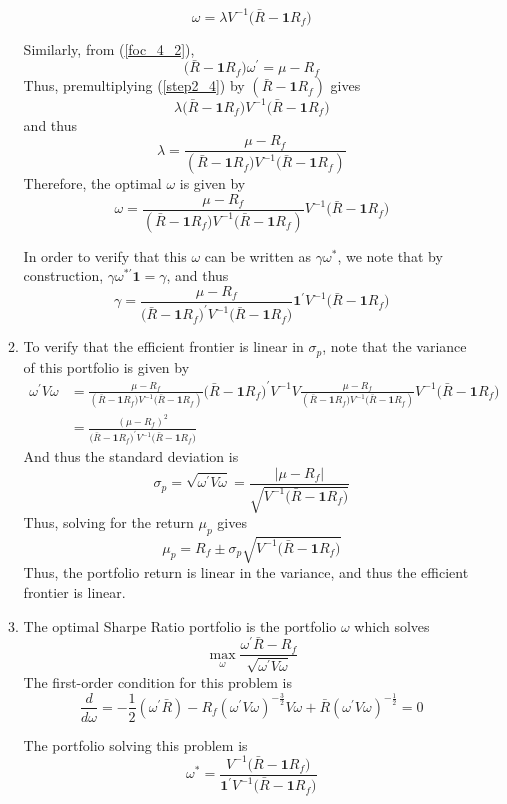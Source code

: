 \documentclass[11pt]{article}
\newcommand{\w}{\omega}
\newcommand{\p}{\prime}
\newcommand{\one}{\mathbf{1}}
\newcommand{\onep}{\mathbf{1}^\prime}
\newcommand{\inv}[1]{#1^{-1}}
\renewcommand{\wp}{\omega^\prime}
\begin{document}
\begin{enumerate}
\begin{enumerate}
		\begin{equation}\label{step2_4}
		\w = \lambda \inv{V} \big(\bar{R} - \one R_f\big)
		\end{equation}
		
		Similarly, from (\ref{foc_4_2}), 
		\[\big(\bar{R} - \one R_f\big)\wp = \mu - R_f\]
		Thus, premultiplying (\ref{step2_4}) by $ (\bar{R} - \one R_f) $ gives
		\[\lambda\big(\bar{R} - \one R_f\big) \inv{V} \big(\bar{R} - \one R_f\big)\]
		and thus
		\[\lambda = \frac{\mu - R_f}{(\bar{R} - \one R_f\big) \inv{V} \big(\bar{R} - \one R_f )}\]
		Therefore, the optimal $ \w $ is given by 
		\[\w = \frac{\mu - R_f}{(\bar{R} - \one R_f\big) \inv{V} \big(\bar{R} - \one R_f )} \inv{V} \big(\bar{R} - \one R_f\big) \]
		
		In order to verify that this $\omega$ can be written as $ \gamma \w^* $, we note that by construction, $ \gamma \w^{*\p} \one = \gamma $, and thus 
		\[\gamma = \frac{\mu - R_f}{\big(\bar{R} - \one R_f\big)^\p \inv{V}\big(\bar{R} - \one R_f\big)} \one^\p \inv{V}\big(\bar{R} - \one R_f\big)\]
		
		\item To verify that the efficient frontier is linear in $ \sigma_p $, note that the variance of this portfolio is given by 
		\begin{align*}
		\wp V\w &= \frac{\mu - R_f}{(\bar{R} - \one R_f\big) \inv{V} \big(\bar{R} - \one R_f )} \big(\bar{R} - \one R_f\big)^\p \inv{V} V \frac{\mu - R_f}{(\bar{R} - \one R_f\big) \inv{V} \big(\bar{R} - \one R_f )} \inv{V} \big(\bar{R} - \one R_f\big) \\
		&= \frac{(\mu - R_f)^2}{\big(\bar{R} - \one R_f\big)^\p \inv{V} \big(\bar{R} - \one R_f\big)}
		\end{align*}
		And thus the standard deviation is 
		\[\sigma_p = \sqrt{\wp V \w} = \frac{|\mu - R_f|}{\sqrt{\inv{V} \big(\bar{R} - \one R_f\big)}}\]
		Thus, solving for the return $ \mu_p $ gives
		\[\mu_p = R_f \pm \sigma_p \sqrt{\inv{V} \big(\bar{R} - \one R_f\big)}\]
		Thus, the portfolio return is linear in the variance, and thus the efficient frontier is linear. 
		
		\item The optimal Sharpe Ratio portfolio is the portfolio $ \w $ which solves
		\[\max_\w \frac{\wp\bar{R} - R_f}{\sqrt{\wp V \w}}\]
		The first-order condition for this problem is 
		\[\frac{d}{d\w} = -\frac{1}{2}(\wp \bar{R}) - R_f (\wp V \w)^{-\frac{3}{2}} V\w + \bar{R}(\wp V \w)^{-\frac{1}{2}} = 0 \]
		
		The portfolio solving this problem is 
		\[\w^* = \frac{\inv{V}\big(\bar{R} - \one R_f\big)}{\onep \inv{V} \big(\bar{R} - \one R_f\big)} \]
		

\end{enumerate}
\end{enumerate}
\end{document}
